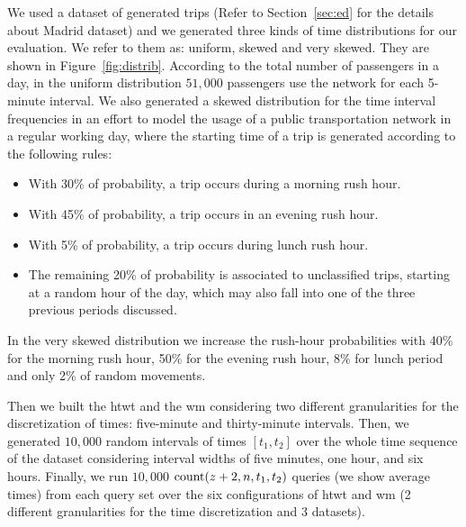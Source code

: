	We used a dataset of generated trips  (Refer to Section~\ref{sec:ed} for the details about Madrid dataset) and we
	generated three kinds of time distributions for our evaluation. We refer to them as: uniform, skewed and very skewed. They are shown
	in Figure~\ref{fig:distrib}. 
	According to the total number of passengers in a day, in the uniform distribution $51,\!000$ passengers 
	use the network for each 5-minute interval. 
	We also generated a skewed distribution for the time interval frequencies in an effort to
	model the usage of a public transportation network in a regular working day, where the starting time of a trip
	is generated according to the following rules:
	\begin{itemize}
		\item With 30\% of probability, a trip occurs during a morning rush hour.
		\item With 45\% of probability, a trip occurs in an evening rush hour.
		\item With 5\% of probability, a trip occurs during lunch rush hour.
		\item The remaining 20\% of probability is associated to unclassified trips, starting at a random hour of the day, which may
		also fall into one of the three previous periods discussed.
	\end{itemize}
	In the very skewed distribution we increase the rush-hour probabilities with
	40\% for the morning rush hour, 50\% for the evening rush hour, 8\% for lunch period and only
	2\% of random movements.
	\medskip

	Then we built the \gls{htwt} and the \gls{wm} considering two different granularities for the discretization of times: 
	five-minute and thirty-minute intervals. Then, we generated $10,\!000$ random intervals of times $[t_1,t_2]$ over the whole 
	time sequence of the dataset considering interval widths of five minutes, one hour, and six hours.  
	Finally, we run $10,\!000$  $\operatorname{count}(z+2,n,t_1,t_2)$ queries (we show average times) from each query set over 
	the six configurations of \gls{htwt} and \gls{wm}  
	(2 different granularities for the time discretization and 3 datasets).






